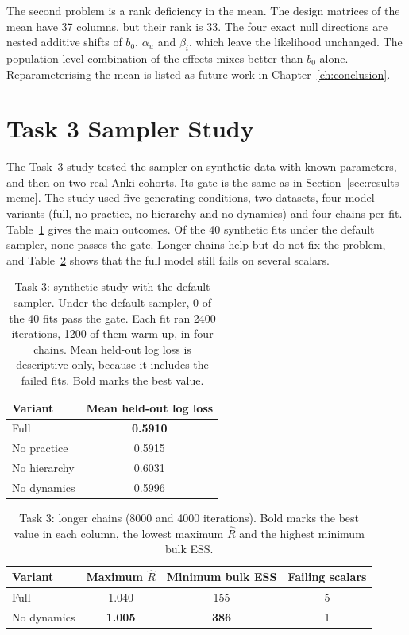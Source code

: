 The second problem is a rank deficiency in the mean. The design matrices of the mean have 37 columns, but their rank is 33.
The four exact null directions are nested additive shifts of $b_0$, $\alpha_u$ and $\beta_i$, which leave the likelihood
unchanged. The population-level combination of the effects mixes better than $b_0$ alone. Reparameterising the mean is listed as future work in Chapter~\ref{ch:conclusion}.

\section{Task 3 Sampler Study}
\label{sec:results-task3}

The Task~3 study tested the sampler on synthetic data with known parameters, and then on two real Anki cohorts. Its
gate is the same as in Section~\ref{sec:results-mcmc}. The study used five generating conditions, two datasets, four model
variants (full, no practice, no hierarchy and no dynamics) and four chains per fit. Table~\ref{tab:task3-synth} gives the
main outcomes. Of the 40 synthetic fits under the default sampler, none passes the gate. Longer chains help but do not fix the
problem, and Table~\ref{tab:task3-long} shows that the full model still fails on several scalars.

\begin{table}[htbp]
  \centering
  \caption[Task 3: synthetic study]{Task 3: synthetic study with the default sampler. Under the default sampler, 0 of the
    40 fits pass the gate. Each fit ran 2400 iterations, 1200 of them warm-up, in four chains. Mean held-out log loss is
    descriptive only, because it includes the failed fits. Bold marks the best value.}
  \label{tab:task3-synth}
  \begin{tabular}{@{}lc@{}}
    \toprule
    Variant & Mean held-out log loss \\
    \midrule
    Full & \textbf{0.5910} \\
    No practice & 0.5915 \\
    No hierarchy & 0.6031 \\
    No dynamics & 0.5996 \\
    \bottomrule
  \end{tabular}
\end{table}

\begin{table}[htbp]
  \centering
  \caption[Task 3: longer chains]{Task 3: longer chains (8000 and 4000 iterations). Bold marks the best value in each column,
    the lowest maximum $\hat R$ and the highest minimum bulk ESS.}
  \label{tab:task3-long}
  \begin{tabular}{@{}lccc@{}}
    \toprule
    Variant & Maximum $\hat R$ & Minimum bulk ESS & Failing scalars \\
    \midrule
    Full & 1.040 & 155 & 5 \\
    No dynamics & \textbf{1.005} & \textbf{386} & 1 \\
    \bottomrule
  \end{tabular}
\end{table}

